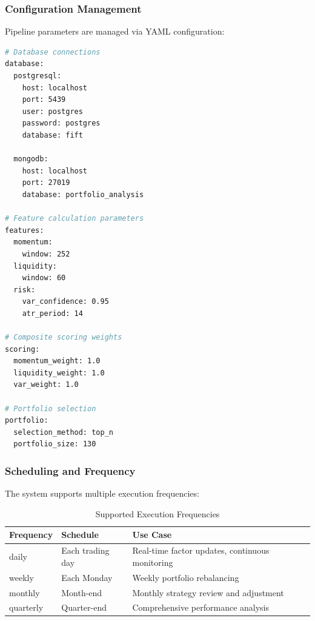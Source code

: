 \documentclass[11pt, a4paper, twoside]{article}
\begin{document}
\subsubsection{Configuration Management}

Pipeline parameters are managed via YAML configuration:

\begin{lstlisting}[language=bash, caption=Configuration Structure (conf.yaml)]
# Database connections
database:
  postgresql:
    host: localhost
    port: 5439
    user: postgres
    password: postgres
    database: fift

  mongodb:
    host: localhost
    port: 27019
    database: portfolio_analysis

# Feature calculation parameters
features:
  momentum:
    window: 252
  liquidity:
    window: 60
  risk:
    var_confidence: 0.95
    atr_period: 14

# Composite scoring weights
scoring:
  momentum_weight: 1.0
  liquidity_weight: 1.0
  var_weight: 1.0

# Portfolio selection
portfolio:
  selection_method: top_n
  portfolio_size: 130
\end{lstlisting}

\subsubsection{Scheduling and Frequency}

The system supports multiple execution frequencies:

\begin{table}[H]
    \centering
    \caption{Supported Execution Frequencies}
    \label{tab:frequencies}
    \begin{tabular}{|l|l|p{5cm}|}
        \hline
        \textbf{Frequency} & \textbf{Schedule} & \textbf{Use Case} \\
        \hline
        daily & Each trading day & Real-time factor updates, continuous monitoring \\
        \hline
        weekly & Each Monday & Weekly portfolio rebalancing \\
        \hline
        monthly & Month-end & Monthly strategy review and adjustment \\
        \hline
        quarterly & Quarter-end & Comprehensive performance analysis \\
        \hline
    \end{tabular}
\end{table}
\end{document}
